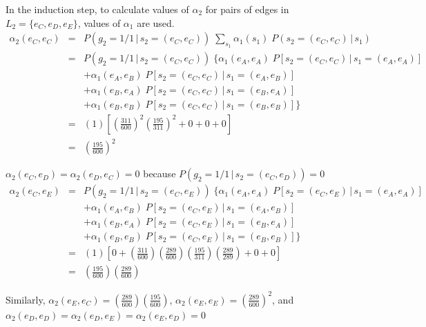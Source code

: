 \documentclass[a4paper,11pt,twoside,abstraction,titlepage]{article}
\begin{document}
\newpage
\noindent In the induction step, to calculate values of $\alpha_2$ for pairs of edges in $L_2 = \{e_{C}, e_{D}, e_{E}\}$, values of $\alpha_1$ are used.
\begin{eqnarray*}
\alpha_2(e_C,e_C) &=& P(g_2=1/1\,|\,s_2=(e_C,e_C)) \; \sum\limits_{s_1} \alpha_1(s_1) \; P(s_2=(e_C,e_C)\,|\,s_1) \\
&=& P(g_2=1/1\,|\,s_2=(e_C,e_C)) \;  \{ \alpha_1(e_A,e_A) \; P[s_2=(e_C,e_C) \,  | \, s_1 = (e_A,e_A)]  \\
&&+  \alpha_1(e_A,e_B) \; P[s_2=(e_C,e_C) \,  | \, s_1 = (e_A,e_B)]\\
&&+ \alpha_1(e_B,e_A) \; P[s_2=(e_C,e_C) \,  | \, s_1 = (e_B,e_A)]\\
&&+\alpha_1(e_B,e_B)\; P[s_2=(e_C,e_C) \,  | \, s_1 = (e_B,e_B)] \} \\
&=& (1)\left[\left( \frac{311}{600} \right)^2 \!\! \left(\frac{195}{311}\right)^2+0+0+0\right] \\
&=& \left( \frac{195}{600} \right)^2
\end{eqnarray*}

\noindent$\alpha_2(e_C,e_D) = \alpha_2(e_D,e_C) = 0$ because $ P(g_2=1/1\,|\,s_2=(e_C,e_D)) = 0$
\begin{eqnarray*}
\alpha_2(e_C,e_E) &=&  P(g_2=1/1\,|\,s_2=(e_C,e_E)) \;  \{ \alpha_1(e_A,e_A) \; P[s_2=(e_C,e_E) \,  | \, s_1 = (e_A,e_A)]\\
&&+  \alpha_1(e_A,e_B) \; P[s_2=(e_C,e_E) \,  | \, s_1 = (e_A,e_B)]\\
&&+ \alpha_1(e_B,e_A) \; P[s_2=(e_C,e_E) \,  | \, s_1 = (e_B,e_A)]\\
&&+\alpha_1(e_B,e_B)\; P[s_2=(e_C,e_E) \,  | \, s_1 = (e_B,e_B)] \} \\
&=& (1)\left[0+\left( \frac{311}{600} \right) \!\! \left( \frac{289}{600} \right) \!\! \left(\frac{195}{311}\right) \!\! \left(\frac{289}{289}\right)+0+0\right] \\
&=& \left( \frac{195}{600} \right) \!\! \left( \frac{289}{600} \right)
\end{eqnarray*}
\vspace{3pt}

\noindent Similarly, $\alpha_2(e_E,e_C) = \left( \frac{289}{600} \right) \!\! \left( \frac{195}{600} \right)$, $\alpha_2(e_E,e_E) = \left( \frac{289}{600} \right)^2 $, and $\alpha_2(e_D,e_D) = \alpha_2(e_D,e_E) = \alpha_2(e_E,e_D)  = 0$
\end{document}
